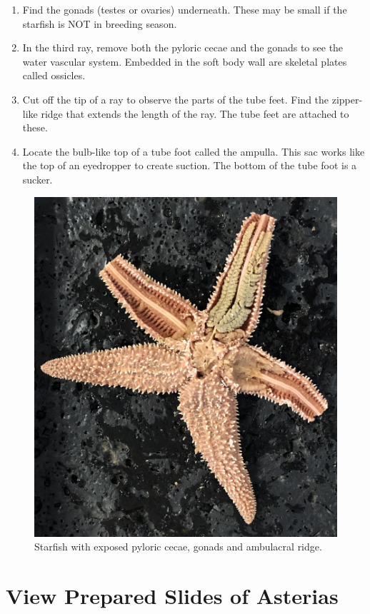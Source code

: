 \begin{enumerate}
\item
  Find the gonads (testes or ovaries) underneath. These may be small if
  the starfish is NOT in breeding season.
\item
  In the third ray, remove both the pyloric cecae and the gonads to see
  the water vascular system. Embedded in the soft body wall are skeletal
  plates called ossicles.
\item
  Cut off the tip of a ray to observe the parts of the tube feet. Find
  the zipper-like ridge that extends the length of the ray. The tube
  feet are attached to these.
\item
  Locate the bulb-like top of a tube foot called the ampulla. This sac
  works like the top of an eyedropper to create suction. The bottom of
  the tube foot is a sucker.
\end{enumerate}

\begin{figure}

{\centering \includegraphics[width=0.7\linewidth]{./figures/echinodermata/starfish}

}

\caption{Starfish with exposed pyloric cecae, gonads and ambulacral ridge.}\label{fig:starfish}
\end{figure}

\section{View Prepared Slides of
Asterias}\label{view-prepared-slides-of-asterias}

